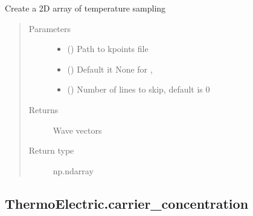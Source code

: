 \documentclass[letterpaper,10pt,english]{sphinxmanual}
\begin{document}
\begin{fulllineitems}
\label{\detokenize{autosummary/ThermoElectric.kpoints:ThermoElectric.kpoints}}
\sphinxAtStartPar
Create a 2D array of temperature sampling
\begin{quote}\begin{description}
\item[{Parameters}] \leavevmode\begin{itemize}
\item {} 
\sphinxAtStartPar
{} () \textendash{} Path to kpoints file

\item {} 
\sphinxAtStartPar
{} () \textendash{} Default it None for ,

\item {} 
\sphinxAtStartPar
{} () \textendash{} Number of lines to skip, default is 0

\end{itemize}

\item[{Returns}] \leavevmode
\sphinxAtStartPar
{} \textendash{} Wave vectors

\item[{Return type}] \leavevmode
\sphinxAtStartPar
np.ndarray

\end{description}\end{quote}

\end{fulllineitems}



\subsection{ThermoElectric.carrier\_concentration}
\label{\detokenize{autosummary/ThermoElectric.carrier_concentration:thermoelectric-carrier-concentration}}\label{\detokenize{autosummary/ThermoElectric.carrier_concentration::doc}}
\end{document}
